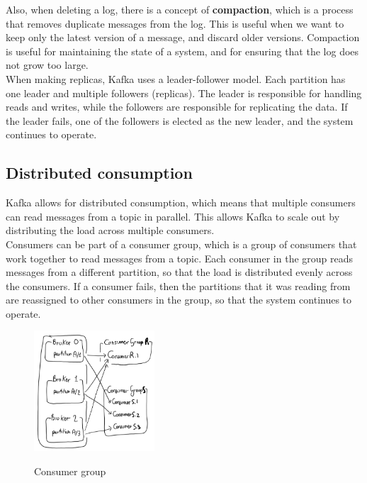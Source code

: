 Also, when deleting a log, there is a concept of \textbf{compaction}, which is a process that removes
duplicate messages from the log. This is useful when we want to keep only the latest version of a message,
and discard older versions. Compaction is useful for maintaining the state of a system, and for ensuring
that the log does not grow too large.\\

When making replicas, Kafka uses a leader-follower model. Each partition has one leader and multiple 
followers (replicas). The leader is responsible for handling reads and writes, while the followers are
responsible for replicating the data. If the leader fails, one of the followers is elected as the new 
leader, and the system continues to operate.

\subsection{Distributed consumption}

Kafka allows for distributed consumption, which means that multiple consumers can read messages from a
topic in parallel. This allows Kafka to scale out by distributing the load across multiple consumers.\\

Consumers can be part of a consumer group, which is a group of consumers that work together to read
messages from a topic. Each consumer in the group reads messages from a different partition, so that
the load is distributed evenly across the consumers. If a consumer fails, then the partitions that it
was reading from are reassigned to other consumers in the group, so that the system continues to operate.

\begin{figure}[H]
    \centering
    \includegraphics[width=0.4\textwidth]{figures/consumer_group.png}
    \label{fig:consumer_group}
    \caption{Consumer group}
\end{figure}


